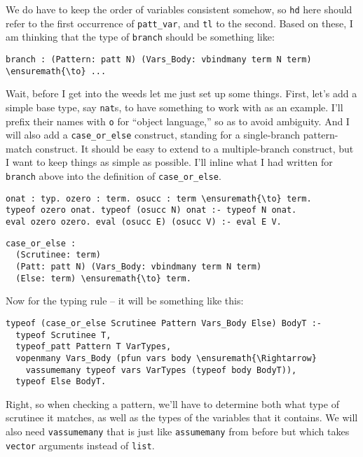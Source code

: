 We do have to keep the order of variables consistent somehow, so
\texttt{hd} here should refer to the first occurrence of
\texttt{patt\_var}, and \texttt{tl} to the second. Based on these, I am
thinking that the type of \texttt{branch} should be something like:

\begin{verbatim}
branch : (Pattern: patt N) (Vars_Body: vbindmany term N term) \ensuremath{\to} ...
\end{verbatim}

Wait, before I get into the weeds let me just set up some things. First,
let's add a simple base type, say \texttt{nat}s, to have something to
work with as an example. I'll prefix their names with \texttt{o} for
``object language,'' so as to avoid ambiguity. And I will also add a
\texttt{case\_or\_else} construct, standing for a single-branch
pattern-match construct. It should be easy to extend to a
multiple-branch construct, but I want to keep things as simple as
possible. I'll inline what I had written for \texttt{branch} above into
the definition of \texttt{case\_or\_else}.

\begin{verbatim}
onat : typ. ozero : term. osucc : term \ensuremath{\to} term.
typeof ozero onat. typeof (osucc N) onat :- typeof N onat.
eval ozero ozero. eval (osucc E) (osucc V) :- eval E V.
\end{verbatim}

\begin{verbatim}
case_or_else :
  (Scrutinee: term)
  (Patt: patt N) (Vars_Body: vbindmany term N term)
  (Else: term) \ensuremath{\to} term.
\end{verbatim}

Now for the typing rule -- it will be something like this:

\begin{verbatim}
typeof (case_or_else Scrutinee Pattern Vars_Body Else) BodyT :-
  typeof Scrutinee T,
  typeof_patt Pattern T VarTypes,
  vopenmany Vars_Body (pfun vars body \ensuremath{\Rightarrow}
    vassumemany typeof vars VarTypes (typeof body BodyT)),
  typeof Else BodyT.
\end{verbatim}

Right, so when checking a pattern, we'll have to determine both what
type of scrutinee it matches, as well as the types of the variables that
it contains. We will also need \texttt{vassumemany} that is just like
\texttt{assumemany} from before but which takes \texttt{vector}
arguments instead of \texttt{list}.

